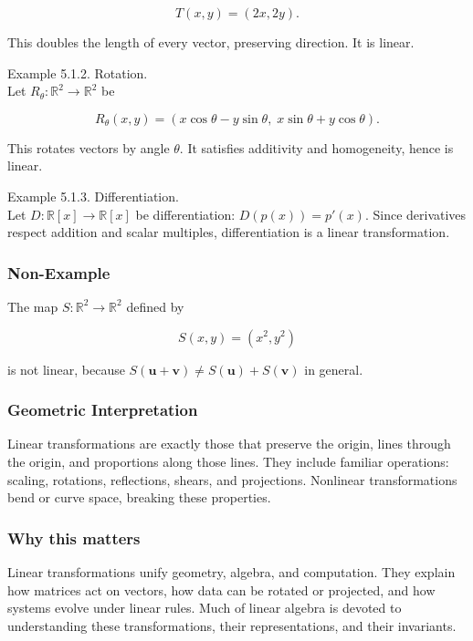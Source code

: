 \documentclass[
  12pt,
  a4paper,
]{article}
\begin{document}
\[T(x,y) = (2x, 2y).\]

This doubles the length of every vector, preserving direction. It is
linear.

Example 5.1.2. Rotation.\\
Let \(R_\theta: \mathbb{R}^2 \to \mathbb{R}^2\) be

\[R_\theta(x,y) = (x\cos\theta - y\sin\theta, \; x\sin\theta + y\cos\theta).\]

This rotates vectors by angle \(\theta\). It satisfies additivity and
homogeneity, hence is linear.

Example 5.1.3. Differentiation.\\
Let \(D: \mathbb{R}[x] \to \mathbb{R}[x]\) be differentiation:
\(D(p(x)) = p'(x)\). Since derivatives respect addition and scalar
multiples, differentiation is a linear transformation.

\subsubsection{Non-Example}\label{non-example}

The map \(S:\mathbb{R}^2 \to \mathbb{R}^2\) defined by

\[S(x,y) = (x^2, y^2)\]

is not linear, because
\(S(\mathbf{u} + \mathbf{v}) \neq S(\mathbf{u}) + S(\mathbf{v})\) in
general.

\subsubsection{Geometric
Interpretation}\label{geometric-interpretation-8}

Linear transformations are exactly those that preserve the origin, lines
through the origin, and proportions along those lines. They include
familiar operations: scaling, rotations, reflections, shears, and
projections. Nonlinear transformations bend or curve space, breaking
these properties.

\subsubsection{Why this matters}\label{why-this-matters-16}

Linear transformations unify geometry, algebra, and computation. They
explain how matrices act on vectors, how data can be rotated or
projected, and how systems evolve under linear rules. Much of linear
algebra is devoted to understanding these transformations, their
representations, and their invariants.
\end{document}
